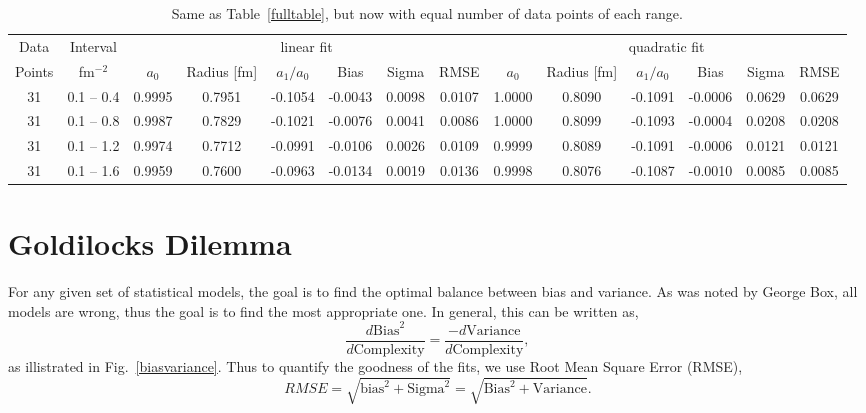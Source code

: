 \documentclass[10pt,aps,prc,twocolumn]{revtex4-1}
\begin{document}
\begin{table}
\caption{Same as Table~\ref{fulltable}, but now with equal number of data points of each range.}
\begin{tabular}{cc|cccccc|cccccc} \hline
Data   & Interval  & \multicolumn{6}{c|}{linear fit}                       & \multicolumn{6}{c}{quadratic fit}                    \\ 
Points & fm$^{-2}$ &   $a_0$  & Radius [fm]&  $a_1/a_0$ &  Bias  & Sigma &  RMSE  &   $a_0$  & Radius [fm]& $a_1/a_0$  &  Bias  & Sigma &  RMSE \\  \hline
31& 0.1 -- 0.4 & 0.9995& 0.7951& -0.1054& -0.0043& 0.0098& 0.0107 & 1.0000& 0.8090& -0.1091& -0.0006& 0.0629& 0.0629 \\
31& 0.1 -- 0.8 & 0.9987& 0.7829& -0.1021& -0.0076& 0.0041& 0.0086 & 1.0000& 0.8099& -0.1093& -0.0004& 0.0208& 0.0208  \\
31& 0.1 -- 1.2 & 0.9974& 0.7712& -0.0991& -0.0106& 0.0026& 0.0109 & 0.9999& 0.8089& -0.1091& -0.0006& 0.0121& 0.0121  \\
31& 0.1 -- 1.6 & 0.9959& 0.7600& -0.0963& -0.0134& 0.0019& 0.0136 & 0.9998& 0.8076& -0.1087& -0.0010& 0.0085& 0.0085  \\  \hline
\end{tabular}
\label{equaldatatable}
\end{table}

\section{Goldilocks Dilemma}

For any given set of statistical models, the goal is to find the optimal balance between bias and variance.   
As was noted by George Box, all models are wrong, thus the goal is to find the most appropriate one. 
In general, this can be written as,
\begin{equation}
\frac{d {\mathrm{Bias}^2 }}{ d {\mathrm{Complexity}}} = \frac{- d {\mathrm{Variance}} }{ d {\mathrm{Complexity}}},
\end{equation}
as illistrated in Fig.~\ref{biasvariance}.
Thus to quantify the goodness of the fits, we use Root Mean Square Error (RMSE),
\begin{equation}
RMSE = \sqrt{ {\mathrm{bias}}^2 + {\mathrm{Sigma}}^2} = \sqrt{{\mathrm{Bias}}^2 + {\mathrm{Variance}}}.
\end{equation}
\end{document}
